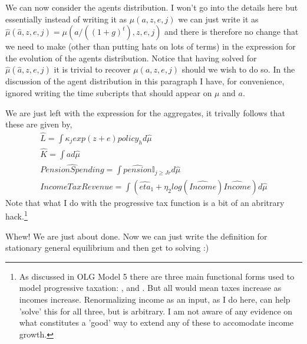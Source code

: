 We can now consider the agents distribution. I won't go into the details here but essentially instead of writing it as $\mu(a,z,e,j)$ we can just write it as $\hat{\mu}(\hat{a},z,e,j)=\mu(a/((1+g)^t),z,e,j)$ and there is therefore no change that we need to make (other than putting hats on lots of terms) in the expression for the evolution of the agents distribution. Notice that having solved for $\hat{\mu}(\hat{a},z,e,j)$ it is trivial to recover $\mu(a,z,e,j)$ should we wish to do so. In the discussion of the agent distribution in this paragraph I have, for convenience, ignored writing the time subcripts that should appear on $\mu$ and $a$.

We are just left with the expression for the aggregates, it trivally follows that these are given by,
\begin{eqnarray*}
 \hat{L}=\int \kappa_j exp(z+e) policy_h d\hat{\mu} \\
 \hat{K}=\int a d\hat{\mu} \\
 \widehat{PensionSpending}=\int \hat{pension} \mathbb{I}_{j\geq Jr} d\hat{\mu} \\
 \widehat{IncomeTaxRevenue}=\int (\hat{eta}_1 + \eta_2 log(\widehat{Income}) \widehat{Income} ) d\hat{\mu}
\end{eqnarray*}
Note that what I do with the progressive tax function is a bit of an abritrary hack.\footnote{As discussed in OLG Model 5 there are three main functional forms used to model progressive taxation: \cite*{GunerKaygusuvVentura2014}, \cite*{GouveiaStrauss1994,GouveiaStrauss1999} and \cite*{HeathcoteStoreslettenViolante2014}. But all would mean taxes increase as incomes increase. Renormalizing income as an input, as I do here, can help 'solve' this for all three, but is arbitrary. I am not aware of any evidence on what constitutes a 'good' way to extend any of these to accomodate income growth.}

Whew! We are just about done. Now we can just write the definition for stationary general equilibrium and then get to solving :)

